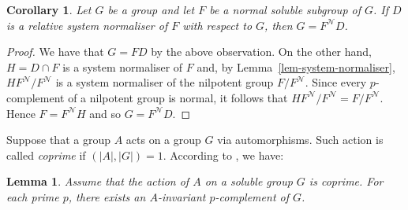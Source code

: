 \documentclass[12pt,a4paper]{article}
\newtheorem{corollary}[theorem]{Corollary}
\newtheorem{lemma}[theorem]{Lemma}
\theoremstyle{definition}
\begin{document}
\begin{corollary}\label{nilres}
Let $G$ be a group and let $F$ be a normal soluble subgroup of $G$. If $D$ is a relative system normaliser of $F$ with respect to $G$, then $G = F^{\mathcal{N}}D$.
\end{corollary}

\begin{proof}
We have that $G = FD$ by the above observation. On the other hand, $H = D \cap F$ is a system normaliser of $F$ and, by Lemma~\ref{lem-system-normaliser}, $HF^{\mathcal{N}}/F^{\mathcal{N}}$ is a system normaliser of the nilpotent group $F/F^{\mathcal{N}}$. Since every $p$-complement of a nilpotent group is normal, it follows that $HF^{\mathcal{N}}/F^{\mathcal{N}} = F/F^{\mathcal{N}}$. Hence $F = F^{\mathcal{N}}H$ and so $G = F^{\mathcal{N}}D$.
\end{proof}



Suppose that a group $A$ acts on a group $G$ via automorphisms. Such action is called \emph{coprime} if $(|A|,|G|)=1$. According to \cite[8.2.6~(a)]{KurzweilStellmacher2004}, we have:
\begin{lemma}\label{lem-coprime-action}
Assume that the action of $A$ on a soluble group $G$ is coprime. For each prime $p$, there exists an $A$-invariant
$p$-complement of $G$.
\end{lemma}
\end{document}

